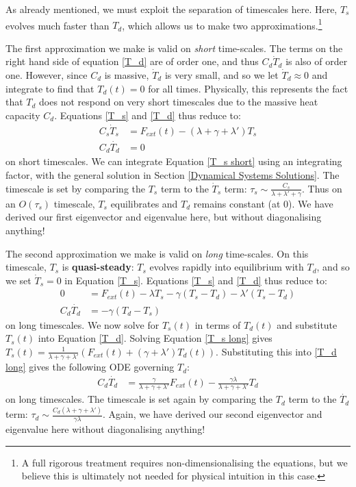 As already mentioned, we must exploit the separation of timescales here. Here, $T_s$ evolves much faster than $T_d$, which allows us to make two approximations.\footnote{A full rigorous treatment requires non-dimensionalising the equations, but we believe this is ultimately not needed for physical intuition in this case.}

The first approximation we make is valid on \textit{short} time-scales. The terms on the right hand side of equation \ref{T_d} are of order one, and thus $C_d\dot T_d$ is also of order one. However, since $C_d$ is massive, $\dot T_d$ is very small, and so we let $\dot T_d\approx0$ and integrate to find that $T_d(t)=0$ for all times. Physically, this represents the fact that $T_d$ does not respond on very short timescales due to the massive heat capacity $C_d$. Equations \ref{T_s} and \ref{T_d} thus reduce to:
\begin{align}
    \label{T_s short}
    C_s\dot T_s &=F_{ext}(t)-(\lambda +\gamma+ \lambda')T_s\\ 
    \label{T_d short}
    C_d \dot{T_d} &= 0
\end{align}
on short timescales. We can integrate Equation \ref{T_s short} using an integrating factor, with the general solution in Section \ref{Dynamical Systems Solutions}. The timescale is set by comparing the $T_s$ term to the $\dot T_s$ term: $\tau_s\sim \frac{C_s}{\lambda+\lambda'+\gamma}$. Thus on an $O(\tau_s)$ timescale, $T_s$ equilibrates and $T_d$ remains constant (at $0$). We have derived our first eigenvector and eigenvalue here, but without diagonalising anything!

The second approximation we make is valid on \textit{long} time-scales. On this timescale, $T_s$ is \textbf{quasi-steady}: $T_s$ evolves rapidly into equilibrium with $T_d$, and so we set $\dot T_s=0$ in Equation \ref{T_s}. Equations \ref{T_s} and \ref{T_d} thus reduce to:
\begin{align}
    0 & = F_{ext}(t)-\lambda T_s -\gamma (T_s-T_d) - \lambda'(T_s-T_d) \label{T_s long} \\ 
    C_d \dot{T_d} &= -\gamma (T_d-T_s) \label{T_d long}
\end{align}
on long timescales. We now solve for $T_s(t)$ in terms of $T_d(t)$ and substitute $T_s(t)$ into Equation \ref{T_d}. Solving Equation \ref{T_s long} gives $T_s(t)=\frac{1}{\lambda+\gamma+\lambda'}\left(F_{ext}(t)+(\gamma+\lambda ')T_d(t)\right)$. Substituting this into \ref{T_d long} gives the following ODE governing $T_d$:
\begin{align}
    C_d \dot{T_d} &= \frac{\gamma}{\lambda+\gamma+\lambda'}F_{ext}(t) - \frac{\gamma\lambda}{\lambda+\gamma+\lambda'}T_d\label{T_d long T_s} 
\end{align}
on long timescales. The timescale is set again by comparing the $T_d$ term to the $\dot{T_d}$ term: $\tau_d\sim \frac{C_d(\lambda+\gamma+\lambda')}{\gamma\lambda}$. Again, we have derived our second eigenvector and eigenvalue here without diagonalising anything!

